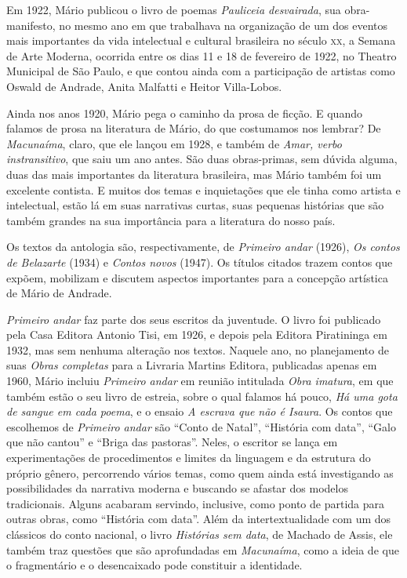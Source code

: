 \documentclass[12pt]{extarticle}
\begin{document}
{Em 1922, Mário publicou o livro de poemas \emph{Pauliceia desvairada},
sua obra-manifesto, no mesmo ano em que trabalhava na organização de um
dos eventos mais importantes da vida intelectual e cultural brasileira
no século \textsc{xx}, a Semana de Arte Moderna, ocorrida entre os dias 11 e 18
de fevereiro de 1922, no Theatro Municipal de São Paulo, e que contou
ainda com a participação de artistas como Oswald de Andrade, Anita
Malfatti e Heitor Villa-Lobos.

Ainda nos anos 1920, Mário pega o caminho da prosa de ficção. E quando
falamos de prosa na literatura de Mário, do que costumamos nos lembrar?
De \emph{Macunaíma}, claro, que ele lançou em 1928, e também de
\emph{Amar, verbo instransitivo}, que saiu um ano antes. São duas
obras-primas, sem dúvida alguma, duas das mais importantes da literatura
brasileira, mas Mário também foi um excelente contista. E muitos dos
temas e inquietações que ele tinha como artista e intelectual, estão lá
em suas narrativas curtas, suas pequenas histórias que são também
grandes na sua importância para a literatura do nosso país.

Os textos da antologia são, respectivamente, de \emph{Primeiro andar}
(1926), \emph{Os contos de Belazarte} (1934) e \emph{Contos novos}
(1947). Os títulos citados trazem contos que expõem, mobilizam e
discutem aspectos importantes para a concepção artística de Mário de
Andrade.

\emph{Primeiro andar} faz parte dos seus escritos da juventude. O livro
foi publicado pela Casa Editora Antonio Tisi, em 1926, e depois pela
Editora Piratininga em 1932, mas sem nenhuma alteração nos textos.
Naquele ano, no planejamento de suas \emph{Obras completas} para a
Livraria Martins Editora, publicadas apenas em 1960, Mário incluiu
\emph{Primeiro andar} em reunião intitulada \emph{Obra imatura}, em que
também estão o seu livro de estreia, sobre o qual falamos há pouco,
\emph{Há uma gota de sangue em cada poema}, e o ensaio \emph{A escrava
que não é Isaura}. Os contos que escolhemos de \emph{Primeiro andar} são
``Conto de Natal'', ``História com data'', ``Galo que não cantou'' e
``Briga das pastoras''. Neles, o escritor se lança em experimentações de
procedimentos e limites da linguagem e da estrutura do próprio gênero,
percorrendo vários temas, como quem ainda está investigando as
possibilidades da narrativa moderna e buscando se afastar dos modelos
tradicionais. Alguns acabaram servindo, inclusive, como ponto de partida
para outras obras, como ``História com data''. Além da intertextualidade
com um dos clássicos do conto nacional, o livro \emph{Histórias sem
data}, de Machado de Assis, ele também traz questões que são
aprofundadas em \emph{Macunaíma}, como a ideia de que o fragmentário e o
desencaixado pode constituir a identidade.

}
\end{document}
